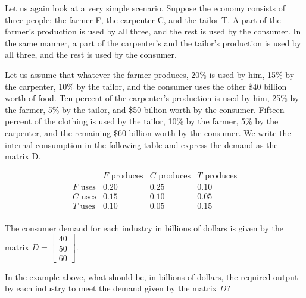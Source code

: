 Let us again look at a very simple scenario. Suppose the economy consists of three people: the farmer F, the carpenter C, and the tailor T. A part of the farmer's production is used by all three, and the rest is used by the consumer. In the same manner, a part of the carpenter's and the tailor's production is used by all three, and the rest is used by the consumer.

Let us assume that whatever the farmer produces, 20\% is used by him, 15\% by the carpenter, 10\% by the tailor, and the consumer uses the other \$40 billion worth of food. Ten percent of the carpenter's production is used by him, 25\% by the farmer, 5\% by the tailor, and \$50 billion worth by the consumer. Fifteen percent of the clothing is used by the tailor, 10\% by the farmer, 5\% by the carpenter, and the remaining \$60 billion worth by the consumer. We write the internal consumption in the following table and express the demand as the matrix D.

\[
    \begin{array}{cccc}
                       & F \text{ produces} & C \text{ produces} & T \text{ produces} \\
        F \text{ uses} & 0.20               & 0.25               & 0.10               \\
        C \text{ uses} & 0.15               & 0.10               & 0.05               \\
        T \text{ uses} & 0.10               & 0.05               & 0.15               \\
    \end{array}
\]

The consumer demand for each industry in billions of dollars is given by the matrix \( D = \begin{bmatrix} 40 \\ 50 \\ 60 \end{bmatrix} \).


\begin{example}
    In the example above, what should be, in billions of dollars, the required output by each industry to meet the demand given by the matrix \( D \)?
\end{example}

